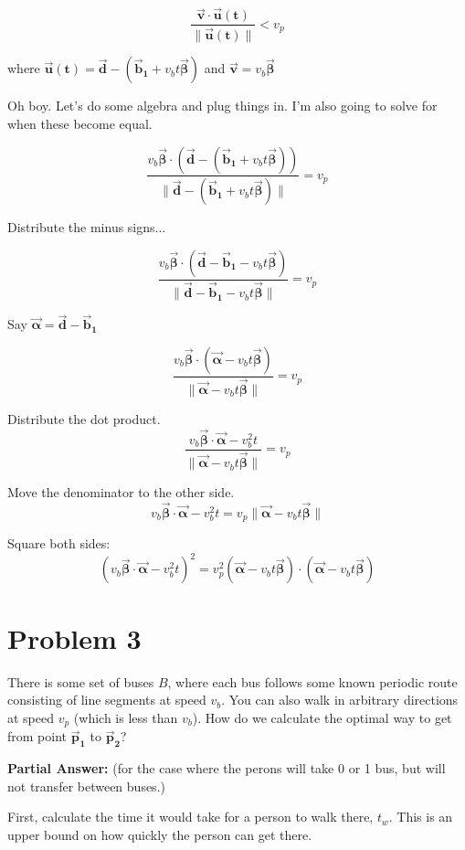 \documentclass[11pt]{article} %
\begin{document}
$$\frac{\bm{\vec{v}} \cdot \bm{\vec{u}(t)}}{\|\bm{\vec{u}(t)}\|}  < v_p$$

where $\bm{\vec{u}(t)} = \bm{\vec{d}} - (\bm{\vec{b}_1} + v_b t\bm{\vec{\beta}})$ and $\bm{\vec{v}} =  v_b\bm{\vec{\beta}}$

Oh boy. Let's do some algebra and plug things in. I'm also going to solve for when these become equal. 


$$\frac{  v_b\bm{\vec{\beta}}  \cdot    (\bm{\vec{d}} - (\bm{\vec{b}_1} + v_b t\bm{\vec{\beta}}))  }{\|  \bm{\vec{d}} - (\bm{\vec{b}_1} + v_b t\bm{\vec{\beta}})  \|}  = v_p$$

Distribute the minus signs...

$$\frac{  v_b\bm{\vec{\beta}}  \cdot    (\bm{\vec{d}} - \bm{\vec{b}_1} - v_b t\bm{\vec{\beta}})  }{\|  \bm{\vec{d}} - \bm{\vec{b}_1} - v_b t\bm{\vec{\beta}}  \|}  = v_p$$

Say $\bm{\vec{\alpha}} = \bm{\vec{d}} - \bm{\vec{b}_1}$

$$\frac{  v_b\bm{\vec{\beta}}  \cdot    (\bm{\vec{\alpha}} - v_b t\bm{\vec{\beta}})  }{\|  \bm{\vec{\alpha}} - v_b t\bm{\vec{\beta}}  \|}  = v_p$$

Distribute the dot product.
$$\frac{  v_b\bm{\vec{\beta}}  \cdot    \bm{\vec{\alpha}} - v_b^2 t  }{\|  \bm{\vec{\alpha}} - v_b t\bm{\vec{\beta}}  \|}  = v_p$$

Move the denominator to the other side. 
$$ v_b\bm{\vec{\beta}}  \cdot    \bm{\vec{\alpha}} - v_b^2 t  = v_p \|  \bm{\vec{\alpha}} - v_b t\bm{\vec{\beta}}  \|$$

Square both sides:
$$ (v_b\bm{\vec{\beta}}  \cdot    \bm{\vec{\alpha}} - v_b^2 t)^2  = v_p^2  (\bm{\vec{\alpha}} - v_b t\bm{\vec{\beta}}) \cdot (\bm{\vec{\alpha}} - v_b t\bm{\vec{\beta}}) $$


\section*{Problem 3}
There is some set of buses $B$, where each bus follows some known periodic route consisting of line segments at speed $v_b$. You can also walk in arbitrary directions at speed $v_p$ (which is less than $v_b$). How do we calculate the optimal way to get from point $\bm{\vec{p}_1}$ to $\bm{\vec{p}_2}$?

 \vspace{0.5cm}\noindent \textbf{Partial Answer:}
(for the case where the perons will take 0 or 1 bus, but will not transfer between  buses.)

First, calculate the time it would take for a person to walk there, $t_w$. This is an upper bound on how quickly the person can get there. 
\end{document}
